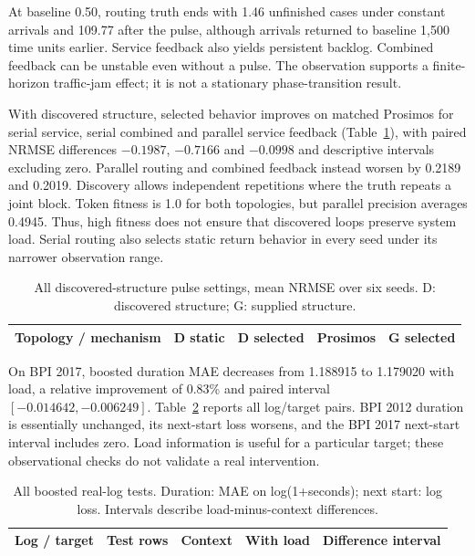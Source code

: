 \documentclass[runningheads]{llncs}
\begin{document}
At baseline 0.50, routing truth ends with 1.46 unfinished cases under constant arrivals and 109.77 after the pulse, although arrivals returned to baseline 1,500 time units earlier. Service feedback also yields persistent backlog. Combined feedback can be unstable even without a pulse. The observation supports a finite-horizon traffic-jam effect; it is not a stationary phase-transition result.

With discovered structure, selected behavior improves on matched Prosimos for serial service, serial combined and parallel service feedback (Table~\ref{tab:structure}), with paired NRMSE differences $-0.1987$, $-0.7166$ and $-0.0998$ and descriptive intervals excluding zero. Parallel routing and combined feedback instead worsen by 0.2189 and 0.2019. Discovery allows independent repetitions where the truth repeats a joint block. Token fitness is 1.0 for both topologies, but parallel precision averages 0.4945. Thus, high fitness does not ensure that discovered loops preserve system load. Serial routing also selects static return behavior in every seed under its narrower observation range.
\begin{table}[t]
\caption{All discovered-structure pulse settings, mean NRMSE over six seeds. D: discovered structure; G: supplied structure.}\label{tab:structure}
\centering\small\setlength{\tabcolsep}{4pt}
\begin{tabular}{lrrrr}\toprule
Topology / mechanism & D static & D selected & Prosimos & G selected\\\midrule

\end{tabular}
\end{table}

On BPI 2017, boosted duration MAE decreases from 1.188915 to 1.179020 with load, a relative improvement of 0.83\% and paired interval $[-0.014642,-0.006249]$. Table~\ref{tab:real} reports all log/target pairs. BPI 2012 duration is essentially unchanged, its next-start loss worsens, and the BPI 2017 next-start interval includes zero. Load information is useful for a particular target; these observational checks do not validate a real intervention.
\begin{table}[t]
\caption{All boosted real-log tests. Duration: MAE on log(1+seconds); next start: log loss. Intervals describe load-minus-context differences.}\label{tab:real}
\centering\small\setlength{\tabcolsep}{4pt}
\begin{tabular}{lrrrr}\toprule
Log / target & Test rows & Context & With load & Difference interval\\\midrule

\end{tabular}
\end{table}
\end{document}
